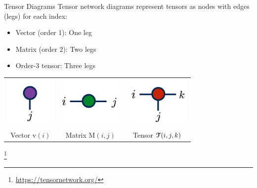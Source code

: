 \documentclass{beamer}
\newcommand{\euler}[1]{\boldsymbol{\EuScript{#1}}}
\newcommand{\romanL}[1]{\boldsymbol{\mathrm{#1}}}
\newcommand\blfootnote[1]{%
  \begingroup
  \renewcommand\thefootnote{}\footnote{#1}%
  \addtocounter{footnote}{-1}%
  \endgroup
}
\begin{document}
\begin{frame}{Tensor Diagrams}
    Tensor network diagrams represent tensors as nodes with edges (legs) for each index:
    \begin{itemize}
        \item Vector (order 1): One leg
        \item Matrix (order 2): Two legs
        \item Order-3 tensor: Three legs
    \end{itemize}

    \begin{center}
        \begin{tabular}{ccc}
            \includegraphics[height=2.5cm]{images/TensorNetwork Images/VectorTensor.png} &
            \includegraphics[height=2.5cm]{images/TensorNetwork Images/MatrixTensor.png} &
            \includegraphics[height=2.5cm]{images/TensorNetwork Images/TensorDiagram_2.png} \\
            Vector $\romanL{v}(i)$ & Matrix $\romanL{M}(i, j)$ & Tensor $\euler{T}(i, j, k)$
        \end{tabular}
    \end{center}

    \blfootnote{\url{https://tensornetwork.org/}}
\end{frame}
\end{document}
